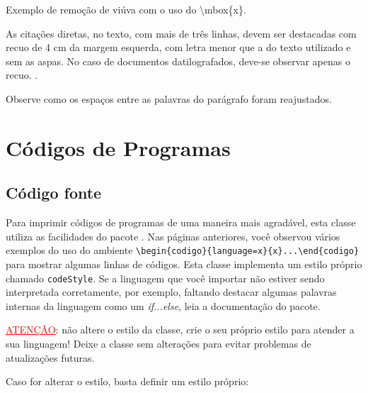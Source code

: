 \begin{codigo}{}{Exemplo de remoção de viúva com o uso do \textbackslash{mbox\{x\}}.}
\begin{citacao}
As citações diretas, no texto, com mais de três linhas, devem ser destacadas com recuo de 4 cm da margem esquerda,
com letra menor que a do texto utilizado e sem as aspas. No caso de documentos datilografados, deve-se observar
apenas o recuo. \mbox{\cite[seção 5.3]{NBR10520:2002}.}
\end{citacao}
\end{codigo}

\noindent
Observe como os espaços entre as palavras do parágrafo foram reajustados.

\section{Códigos de Programas}

\subsection{Código fonte}

Para imprimir códigos de programas de uma maneira mais agradável, esta classe utiliza as facilidades do pacote . Nas páginas anteriores, você observou vários exemplos do uso do ambiente \Verb+\begin{codigo}{language=x}{x}...\end{codigo}+ para mostrar algumas linhas de códigos. Esta classe implementa um estilo próprio chamado \texttt{codeStyle}. Se a linguagem que você importar não estiver sendo interpretada corretamente, por exemplo, faltando destacar algumas palavras internas da linguagem como um \emph{if...else}, leia a documentação do pacote. 

\vspace{20pt}
\noindent
\textcolor{red}{\uline{ATENÇÃO}}: não altere o estilo da classe, crie o seu próprio estilo para atender a sua linguagem! Deixe a classe sem alterações para evitar problemas de atualizações futuras.
\vspace{20pt}

Caso for alterar o estilo, basta definir um estilo próprio:

